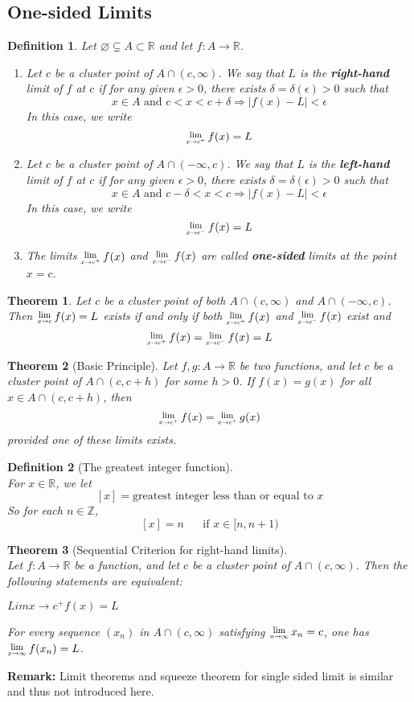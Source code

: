 \documentclass[8pt]{article}
\newcommand{\Lim}[1]{\raisebox{0.5ex}{\scalebox{0.8}{$\displaystyle \lim_{#1}\;$}}}
\newtheorem{definition}{Definition}[section]
\newtheorem{theorem}{Theorem}[section]
\theoremstyle{definition}
\begin{document}
\subsection{One-sided Limits}
\begin{definition}\normalfont
Let $\varnothing\subsetneq A\subset \mathbb{R}$ and let $f:A\to\mathbb{R}$.
\begin{enumerate}
\item Let $c$ be a cluster point of $A\cap(c,\infty)$. We say that $L$ is the \textbf{right-hand} limit of $f$ at $c$ if for any given $\epsilon>0$, there exists $\delta=\delta(\epsilon)>0$ such that
\[
x\in A \text{ and }c<x<c+\delta\Rightarrow |f(x)-L|<\epsilon
\]
In this case, we write
\[
\Lim{x\to c^+}f(x)=L
\]
\item Let $c$ be a cluster point of $A\cap (-\infty,c)$. We say that $L$ is the \textbf{left-hand} limit of $f$ at $c$ if for any  given $\epsilon>0$, there exists $\delta=\delta(\epsilon)>0$ such that
\[
x\in A \text{ and }c-\delta<x<c\Rightarrow |f(x)-L|<\epsilon
\]
In this case, we write
\[
\Lim{x\to c^-}f(x)=L
\]
\item The limits $\Lim{x\to c^+}f(x)$ and $\Lim{x\to c^-}f(x)$ are called \textbf{one-sided} limits at the point $x=c$. 
\end{enumerate}
\end{definition}
\begin{theorem}\normalfont Let $c$ be a cluster point of both $A\cap (c,\infty)$ and $A\cap (-\infty,c)$. Then $\Lim{x\to c}f(x)=L$ exists if and only if both $\Lim{x\to c^+}f(x)$ and $\Lim{x\to c^-}f(x)$ exist and 
\[
\Lim{x\to c^+}f(x)=\Lim{x\to c^-}f(x)=L 
\]
\end{theorem}
\begin{theorem}[Basic Principle]\normalfont Let $f,g:A\to \mathbb{R}$ be two functions, and let $c$ be a cluster point of $A\cap (c,c+h)$ for some $h>0$. If $f(x)=g(x)$ for all $x\in A\cap (c,c+h)$, then
\[
\Lim{x\to c^+}f(x)=\Lim{x\to c^+}g(x)
\] 
provided one of these limits exists.
\end{theorem}
\begin{definition}[The greatest integer function]
\hfill\\\normalfont For $x\in\mathbb{R}$, we let
\[
[x]=\text{greatest integer less than or equal to }x
\]
So for each $n\in\mathbb{Z}$,
\[
[x]=n\;\;\;\;\;\;\text{if }x\in[n,n+1)
\]
\end{definition}
\begin{theorem}[Sequential Criterion for right-hand limits]
\hfill\\\normalfont Let $f:A\to\mathbb{R}$ be a function, and let $c$ be a cluster point of $A\cap(c,\infty)$. Then the following statements are equivalent:
\item $Lim{x\to c^+}f(x)=L$
\item For every sequence $(x_n)$ in $A\cap(c,\infty)$ satisfying $\Lim{n\to\infty}x_n=c$, one has $\Lim{x\to \infty}f(x_n)=L$.
\end{theorem}
\textbf{Remark:} Limit theorems and squeeze theorem for single sided limit is similar and thus not introduced here.
\end{document}
